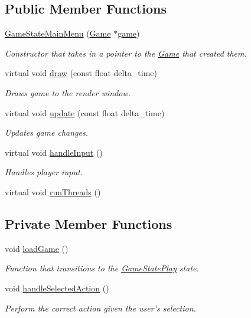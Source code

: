 \subsection*{Public Member Functions}
\begin{DoxyCompactItemize}
\item 
\hyperlink{class_game_state_main_menu_a7d7b3f28e70701ec9af22098b4220ec1}{Game\+State\+Main\+Menu} (\hyperlink{class_game}{Game} $\ast$\hyperlink{class_game_state_a355a79415b9ef63c2aec1448a99f6e71}{game})
\begin{DoxyCompactList}\small\item\em Constructor that takes in a pointer to the \hyperlink{class_game}{Game} that created them. \end{DoxyCompactList}\item 
virtual void \hyperlink{class_game_state_main_menu_ad34efc1ade7193ce765d00ac60f019ed}{draw} (const float delta\+\_\+time)
\begin{DoxyCompactList}\small\item\em Draws game to the render window. \end{DoxyCompactList}\item 
virtual void \hyperlink{class_game_state_main_menu_a796234ad5719f191b1e44affaa48026f}{update} (const float delta\+\_\+time)
\begin{DoxyCompactList}\small\item\em Updates game changes. \end{DoxyCompactList}\item 
virtual void \hyperlink{class_game_state_main_menu_a91ca3c60e107d135ab67c5f9e05e8aa6}{handle\+Input} ()
\begin{DoxyCompactList}\small\item\em Handles player input. \end{DoxyCompactList}\item 
virtual void \hyperlink{class_game_state_main_menu_a2ba60c5da8bcb0c20988165a69f238a9}{run\+Threads} ()
\end{DoxyCompactItemize}
\subsection*{Private Member Functions}
\begin{DoxyCompactItemize}
\item 
void \hyperlink{class_game_state_main_menu_a76d18652314696ffa6369713ef5be3ed}{load\+Game} ()
\begin{DoxyCompactList}\small\item\em Function that transitions to the \hyperlink{class_game_state_play}{Game\+State\+Play} state. \end{DoxyCompactList}\item 
void \hyperlink{class_game_state_main_menu_a85d646b336e1bb6372d851f4f654e6f1}{handle\+Selected\+Action} ()
\begin{DoxyCompactList}\small\item\em Perform the correct action given the user's selection. \end{DoxyCompactList}\end{DoxyCompactItemize}
